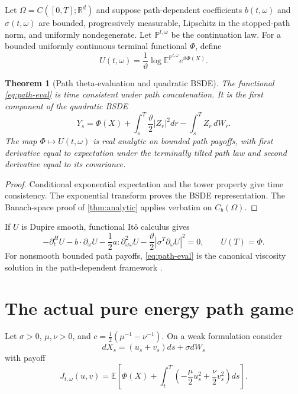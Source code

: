 \documentclass[11pt,reqno]{amsart}
\newtheorem{theorem}{Theorem}[section]
\theoremstyle{definition}
\theoremstyle{remark}
\newcommand{\E}{\mathbb E}
\newcommand{\Pp}{\mathbb P}
\newcommand{\R}{\mathbb R}
\newcommand{\abs}[1]{\left\lvert #1\right\rvert}
\begin{document}
Let $\Omega=C([0,T];\R^d)$ and suppose path-dependent coefficients
$b(t,\omega)$ and $\sigma(t,\omega)$ are bounded, progressively measurable,
Lipschitz in the stopped-path norm, and uniformly nondegenerate.  Let
$\Pp^{t,\omega}$ be the continuation law.  For a bounded uniformly continuous
terminal functional $\Phi$, define
\begin{equation}\label{eq:path-eval}
 U(t,\omega)=\frac1\vartheta
 \log\E^{\Pp^{t,\omega}}e^{\vartheta\Phi(X)}.
\end{equation}

\begin{theorem}[Path theta-evaluation and quadratic BSDE]\label{thm:path}
The functional \eqref{eq:path-eval} is time consistent under path
concatenation.  It is the first component of the quadratic BSDE
\begin{equation}\label{eq:path-BSDE}
 Y_s=\Phi(X)+\int_s^T\frac\vartheta2\abs{Z_r}^2dr
 -\int_s^TZ_r\,dW_r.
\end{equation}
The map $\Phi\mapsto U(t,\omega)$ is real analytic on bounded path payoffs,
with first derivative equal to expectation under the terminally tilted path
law and second derivative equal to its covariance.
\end{theorem}

\begin{proof}
Conditional exponential expectation and the tower property give time
consistency.  The exponential transform proves the BSDE representation.
The Banach-space proof of \cref{thm:analytic} applies verbatim on
$C_b(\Omega)$.
\end{proof}

If $U$ is Dupire smooth, functional It\^o calculus
\cite{Dupire2009,ContFournie2013} gives
\begin{equation}\label{eq:PPDE}
 -\partial_t^HU-b\cdot\partial_\omega U
 -\frac12a:\partial_{\omega\omega}^2U
 -\frac\vartheta2\abs{\sigma^T\partial_\omega U}^2=0,
 \qquad U(T)=\Phi.
\end{equation}
For nonsmooth bounded path payoffs, \eqref{eq:path-eval} is the canonical
viscosity solution in the path-dependent framework
\cite{EkrenTouziZhang2014I,EkrenTouziZhang2014II}.

\section{The actual pure energy path game}\label{sec:path-game}

Let $\sigma>0$, $\mu,\nu>0$, and
$c=\frac12(\mu^{-1}-\nu^{-1})$.  On a weak formulation consider
\[
 dX_s=(u_s+v_s)ds+\sigma dW_s
\]
with payoff
\begin{equation}\label{eq:path-game-payoff}
 J_{t,\omega}(u,v)=\E\left[
 \Phi(X)+\int_t^T
 \left(-\frac\mu2u_s^2+
 \frac\nu2v_s^2\right)ds\right].
\end{equation}
\end{document}
